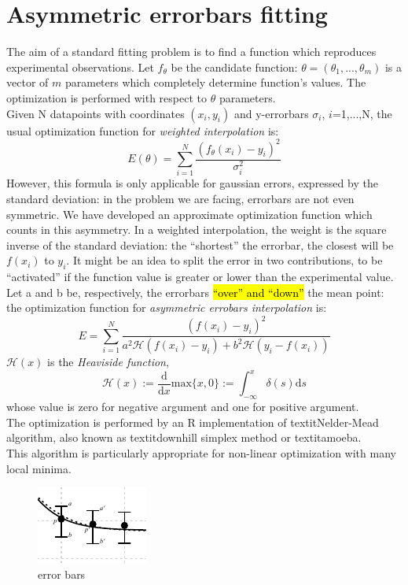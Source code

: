 \section{Asymmetric errorbars fitting}
The aim of a standard fitting problem is to find a function which
reproduces experimental observations.
Let $f_{\theta}$ be the candidate function:
$\theta=(\theta_1,...,\theta_m)$ is a vector of $m$ parameters which
completely determine function's values.
The optimization is performed with respect to $\theta$ parameters.\\
Given N datapoints with coordinates ${(x_i,y_i)}$ and y-errorbars
$\sigma_i$, $i$=1,...,N, the usual optimization function for
\textit{weighted interpolation}\cite{interpolation} is:
$$
E(\theta)= \sum_{i=1}^{N} \frac{(f_{\theta}(x_i)-y_i)^2}{\sigma_{i}^2}
$$
However, this formula is only applicable for gaussian errors,
expressed by the standard deviation: in the problem we are facing,
errorbars are not even symmetric.
We have developed an approximate optimization function which counts
in this asymmetry.
In a weighted interpolation, the weight is the square inverse of the
standard deviation: the ``shortest'' the errorbar, the closest will
be $f(x_i)$ to $y_i$.
It might be an idea to split the error in two contributions,
to be ``activated'' if the function value is greater or lower
than the experimental value.
Let a and b be, respectively, the errorbars \hl{``over'' and ``down''}
the mean point: the optimization function for \textit{asymmetric
  errobars interpolation} is:
$$ E= \sum_{i=1}^{N} \frac{(f(x_i)-y_i)^2}{a^{2}\mathcal{H}(f(x_i)-y_i)+b^{2}\mathcal{H}(y_i-f(x_i))} $$
$\mathcal{H}(x)$ is the \textit{Heaviside function},
$$\mathcal{H}(x):=\frac{\mathrm{d}}{\mathrm{d}x}\mathrm{max}
\{x,0\}:=\int_{-\infty}^x \delta (s) \mathrm{d}s$$ whose value
is zero for negative argument and one for positive argument.\\
The optimization is performed by an R implementation\cite{Roptim}
of textit{Nelder-Mead algorithm},\cite{neldermeadoriginal}
also known as textit{downhill simplex method} or
textit{amoeba}.\cite{neldermeadnumrec}\\
This algorithm is particularly appropriate for non-linear
optimization with many local minima.
\begin{figure}[htpb]
  \centering
  \includegraphics[width=.4\columnwidth]{img/err.pdf}
  \caption{error bars}
  \label{fig:errors}
\end{figure}
